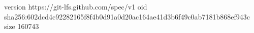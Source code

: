 version https://git-lfs.github.com/spec/v1
oid sha256:602dcd4c92282165f8f4b0d91a0d20ac164ae41d3b6f49c0ab7181b868ef943c
size 160743

